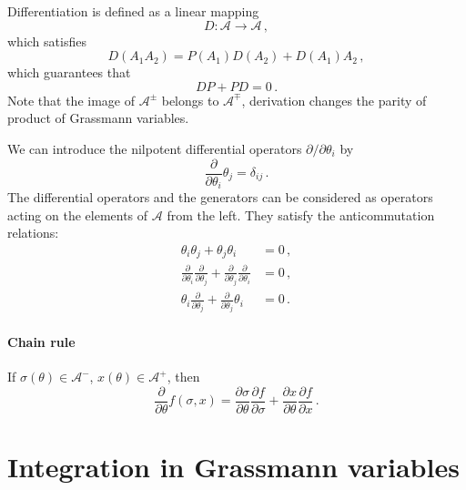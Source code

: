 \documentclass[notes]{subfiles}
\begin{document}
\begin{subappendices}
Differentiation is defined as a linear mapping
\begin{equation}
  \label{eq:GrassDiff}
  D: \mathcal{A} \to \mathcal{A}\, ,
\end{equation}
which satisfies
\begin{equation}
  \label{eq:GrassDiffProp}
  D(A_1 A_2) = P(A_1) D(A_2) + D(A_1) A_2\, ,
\end{equation}
which guarantees that
\begin{equation}
  \label{eq:GrassDiffParity}
  D P + P D = 0\, .
\end{equation}
Note that the image of $\mathcal{A}^\pm$ belongs to
$\mathcal{A}^\mp$, \ie derivation changes the parity of product of
Grassmann variables. 

We can introduce the nilpotent differential operators
$\partial/\partial\theta_i$ by
\begin{equation}
  \label{eq:DiffOpsBasis}
  \frac{\partial}{\partial \theta_i} \theta_j = \delta_{ij}\, . 
\end{equation}
The differential operators and the generators can be considered as
operators acting on the elements of $\mathcal{A}$ from the left. They
satisfy the anticommutation relations:
\begin{align}
  \label{eq:AntiComm1}
  \theta_i \theta_j + \theta_j \theta_i &= 0\, ,\\
  \label{eq:AntiComm2}
  \frac{\partial}{\partial\theta_i} \frac{\partial}{\partial\theta_j}
  + \frac{\partial}{\partial\theta_j}
  \frac{\partial}{\partial\theta_i} &= 0\, , \\
  \label{eq:AntiComm3}
  \theta_i \frac{\partial}{\partial\theta_j} +
  \frac{\partial}{\partial\theta_j} \theta_i &= 0\, .
\end{align}

\paragraph{Chain rule}

If $\sigma(\theta)\in\mathcal{A}^-$, $x(\theta)\in \mathcal{A}^+$,
then
\begin{equation}
  \label{eq:GrassChainRule}
  \frac{\partial}{\partial\theta} f(\sigma,x) = 
  \frac{\partial\sigma}{\partial\theta} \frac{\partial
    f}{\partial\sigma} 
  + \frac{\partial x}{\partial\theta} \frac{\partial f}{\partial x}\, .
\end{equation}

\section{Integration in Grassmann variables}
\label{sec:integr-grassm-vari}


\end{subappendices}
\end{document}
